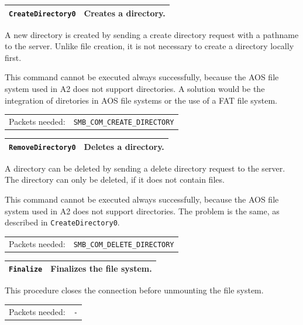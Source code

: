 \documentclass[11pt,a4paper]{book}
\begin{document}
\begin{center}
\renewcommand{\tabcolsep}{5mm}
\begin{tabular}{p{3cm}p{8cm}}
\texttt{CreateDirectory0} & \textbf{Creates a directory.} \\ 
\hline
\end{tabular}
\end{center}
A new directory is created by sending a create directory request with a pathname to the server. Unlike file creation, it is not necessary to create a directory locally first.

This command cannot be executed always successfully, because the AOS file system used in A2 does not support directories. A solution would be the integration of diretories in AOS file systems or the use of a FAT file system. \\
\renewcommand{\tabcolsep}{5mm}
\begin{tabular}{p{3cm}p{8cm}}
Packets needed: & \texttt{SMB\_COM\_CREATE\_DIRECTORY} \\
\end{tabular}

\begin{center}
\renewcommand{\tabcolsep}{5mm}
\begin{tabular}{p{3cm}p{8cm}}
\texttt{RemoveDirectory0} & \textbf{Deletes a directory.} \\ 
\hline
\end{tabular}
\end{center}
A directory can be deleted by sending a delete directory request to the server. The directory can only be deleted, if it does not contain files.

This command cannot be executed always successfully, because the AOS file system used in A2 does not support directories. The problem is the same, as described in \texttt{CreateDirectory0}. \\
\renewcommand{\tabcolsep}{5mm}
\begin{tabular}{p{3cm}p{8cm}}
Packets needed: & \texttt{SMB\_COM\_DELETE\_DIRECTORY} \\
\end{tabular}

\begin{center}
\renewcommand{\tabcolsep}{5mm}
\begin{tabular}{p{3cm}p{8cm}}
\texttt{Finalize} & \textbf{Finalizes the file system.} \\ 
\hline
\end{tabular}
\end{center}
This procedure closes the connection before unmounting the file system. \\
\renewcommand{\tabcolsep}{5mm}
\begin{tabular}{p{3cm}p{8cm}}
Packets needed: & \texttt{-} \\
\end{tabular}
\end{document}
